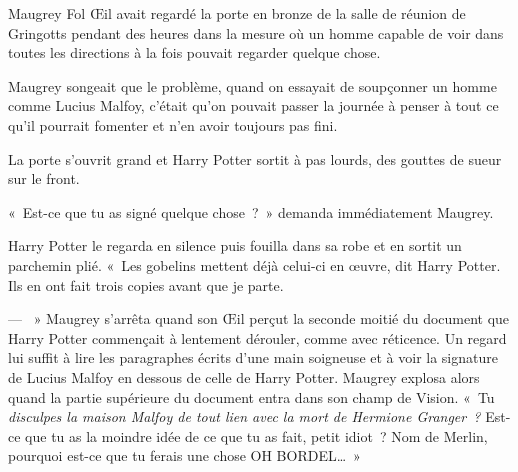 \later

Maugrey Fol Œil avait regardé la porte en bronze de la salle de réunion de Gringotts pendant des heures dans la mesure où un homme capable de voir dans toutes les directions à la fois pouvait regarder quelque chose.

Maugrey songeait que le problème, quand on essayait de soupçonner un homme comme Lucius Malfoy, c'était qu'on pouvait passer la journée à penser à tout ce qu'il pourrait fomenter et n'en avoir toujours pas fini.

La porte s'ouvrit grand et Harry Potter sortit à pas lourds, des gouttes de sueur sur le front.

«~Est-ce que tu as signé quelque chose~?~» demanda immédiatement Maugrey.

Harry Potter le regarda en silence puis fouilla dans sa robe et en sortit un parchemin plié. «~Les gobelins mettent déjà celui-ci en œuvre, dit Harry Potter. Ils en ont fait trois copies avant que je parte.

--- ~» Maugrey s'arrêta quand son Œil perçut la seconde moitié du document que Harry Potter commençait à lentement dérouler, comme avec réticence. Un regard lui suffit à lire les paragraphes écrits d'une main soigneuse et à voir la signature de Lucius Malfoy en dessous de celle de Harry Potter. Maugrey explosa alors quand la partie supérieure du document entra dans son champ de Vision. «~Tu \emph{disculpes la maison Malfoy de tout lien avec la mort de Hermione Granger~?} Est-ce que tu as la moindre idée de ce que tu as fait, petit idiot~? Nom de Merlin, pourquoi est-ce que tu ferais une chose OH BORDEL…~»

